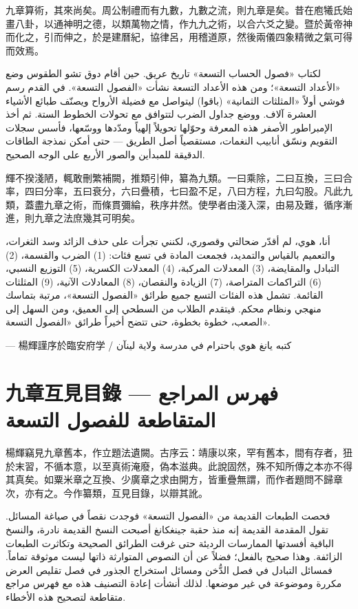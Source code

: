 \documentclass[11pt,a4paper]{article}
\newcommand{\ar}[1]{\arabicfont\beginR #1\endR}
\newcommand{\ChinCol}[1]{\begin{minipage}[t]{0.48\textwidth}#1\end{minipage}}
\newcommand{\ArabCol}[1]{\begin{minipage}[t]{0.48\textwidth}\arabicfont\beginR #1\endR\end{minipage}}
\newcommand{\parallelsection}[2]{%
  \noindent\ChinCol{#1}\hfill\ArabCol{#2}\par\vspace{0.5cm}%
}
\begin{document}
\parallelsection{%
九章算術，其來尚矣。周公制禮而有九數，九數之流，則九章是矣。昔在庖犧氏始畫八卦，以通神明之德，以類萬物之情，作九九之術，以合六爻之變。暨於黃帝神而化之，引而伸之，於是建曆紀，協律呂，用稽道原，然後兩儀四象精微之氣可得而效焉。
}{%
لكتاب «فصول الحساب التسعة» تاريخ عريق. حين أقام دوق تشو الطقوس وضع «الأعداد التسعة»؛ ومن هذه الأعداد التسعة نشأت «الفصول التسعة». في القدم رسم فوشي أولاً «المثلثات الثمانية» (باقوا) ليتواصل مع فضيلة الأرواح ويصنّف طبائع الأشياء العشرة آلاف. ووضع جداول الضرب لتتوافق مع تحولات الخطوط الستة. ثم أخذ الإمبراطور الأصفر هذه المعرفة وحوّلها تحويلاً إلهياً ومدّدها ووسّعها، فأسس سجلات التقويم ونسّق أنابيب النغمات، مستقصياً أصل الطريق --- حتى أمكن نمذجة الطاقات الدقيقة للمبدأين والصور الأربع على الوجه الصحيح.
}

\parallelsection{%
輝不揆淺陋，輒敢刪繁補闕，推類引伸，纂為九類。一曰乘除，二曰互換，三曰合率，四曰分率，五曰衰分，六曰疊積，七曰盈不足，八曰方程，九曰勾股。凡此九類，蓋盡九章之術，而條貫彌綸，秩序井然。使學者由淺入深，由易及難，循序漸進，則九章之法庶幾其可明矣。
}{%
أنا، هوي، لم أقدّر ضحالتي وقصوري، لكنني تجرأت على حذف الزائد وسد الثغرات، والتعميم بالقياس والتمديد، فجمعت المادة في تسع فئات: (1) الضرب والقسمة، (2) التبادل والمقايضة، (3) المعدلات المركبة، (4) المعدلات الكسرية، (5) التوزيع النسبي، (6) التراكمات المتراصة، (7) الزيادة والنقصان، (8) المعادلات الآنية، (9) المثلثات القائمة. تشمل هذه الفئات التسع جميع طرائق «الفصول التسعة»، مرتبة بتماسك منهجي ونظام محكم. فيتقدم الطلاب من السطحي إلى العميق، ومن السهل إلى الصعب، خطوة بخطوة، حتى تتضح أخيراً طرائق «الفصول التسعة».
}

\begin{flushright}
--- 楊輝謹序於臨安府学 / \ar{كتبه يانغ هوي باحترام في مدرسة ولاية لينآن}
\end{flushright}

\newpage

\section*{九章互見目錄 --- \ar{فهرس المراجع المتقاطعة للفصول التسعة}}

\parallelsection{%
楊輝竊見九章舊本，作立題法遺闕。古序云：靖康以來，罕有舊本，間有存者，狃於末習，不循本意，以至真術淹廢，偽本滋典。此說固然，殊不知所傳之本亦不得其真矣。如粟米章之互換、少廣章之求由開方，皆重疊無謂，而作者題問不歸章次，亦有之。今作纂類，互見目錄，以辯其訛。
}{%
فحصت الطبعات القديمة من «الفصول التسعة» فوجدت نقصاً في صياغة المسائل. تقول المقدمة القديمة إنه منذ حقبة جينغكانغ أصبحت النسخ القديمة نادرة، والنسخ الباقية أفسدتها الممارسات الرديئة حتى غرقت الطرائق الصحيحة وتكاثرت الطبعات الزائفة. وهذا صحيح بالفعل؛ فضلاً عن أن النصوص المتوارثة ذاتها ليست موثوقة تماماً. فمسائل التبادل في فصل الدُّخن ومسائل استخراج الجذور في فصل تقليص العرض مكررة وموضوعة في غير موضعها. لذلك أنشأت إعادة التصنيف هذه مع فهرس مراجع متقاطعة لتصحيح هذه الأخطاء.
}
\end{document}
